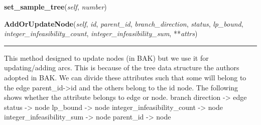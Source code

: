     \vspace{0.5ex}

\hspace{.8\funcindent}\begin{boxedminipage}{\funcwidth}

    \raggedright \textbf{set\_sample\_tree}(\textit{self}, \textit{number})

\setlength{\parskip}{2ex}
\setlength{\parskip}{1ex}
    \end{boxedminipage}

    \label{coinor:grumpy:BB:BBTree:AddOrUpdateNode}

    \vspace{0.5ex}

\hspace{.8\funcindent}\begin{boxedminipage}{\funcwidth}

    \raggedright \textbf{AddOrUpdateNode}(\textit{self}, \textit{id}, \textit{parent\_id}, \textit{branch\_direction}, \textit{status}, \textit{lp\_bound}, \textit{integer\_infeasibility\_count}, \textit{integer\_infeasibility\_sum}, **\textit{attrs})

    \vspace{-1.5ex}

    \rule{\textwidth}{0.5\fboxrule}
\setlength{\parskip}{2ex}
    This method designed to update nodes (in BAK) but we use it for 
    updating/adding arcs. This is because of the tree data structure the 
    authors adopted in BAK. We can divide these attributes such that some 
    will belong to the edge parent\_id-{\textgreater}id and the others 
    belong to the id node. The following shows whether the attribute 
    belongs to edge or node. branch direction -{\textgreater} edge status 
    -{\textgreater} node lp\_bound -{\textgreater} node 
    integer\_infeasibility\_count -{\textgreater} node 
    integer\_infeasibility\_sum -{\textgreater} node parent\_id 
    -{\textgreater} node

\setlength{\parskip}{1ex}
    \end{boxedminipage}

    \label{coinor:grumpy:BB:BBTree:IsBetterThan}

